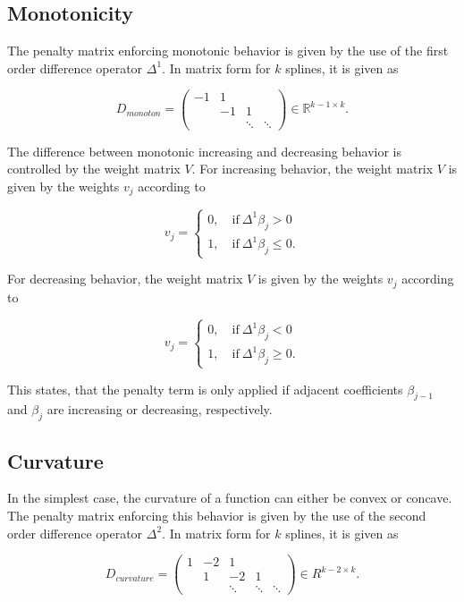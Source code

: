 \documentclass[10pt,a4paper]{article}
\begin{document}
	
	\subsection{Monotonicity}
	
	The penalty matrix enforcing monotonic behavior is given by the use of the first order difference operator $\Delta^1$. In matrix form for $k$ splines, it is given as
	
	$$D_{monoton} = \begin{pmatrix} -1 & 1  \\ 
									& -1 & 1 \\ 
									& & \ddots & \ddots  
				    \end{pmatrix} \in \mathbb{R}^{k-1 \times k}.$$
	
	The difference between monotonic increasing and decreasing behavior is controlled by the weight matrix $V$. For increasing behavior, the weight matrix $V$ is given by the weights $v_j$ according to
	
	$$v_j = \begin{cases} 0, \quad \text{if} \ \Delta^1\beta_j > 0 \\ 
					      1, \quad \text{if} \ \Delta^1\beta_j \le 0.
			\end{cases}$$
	
	For decreasing behavior, the weight matrix $V$ is given by the weights $v_j$ according to
	
	$$v_j = \begin{cases} 0, \quad \text{if} \ \Delta^1\beta_j < 0 \\ 
						  1, \quad \text{if} \ \Delta^1\beta_j \ge 0.
			\end{cases}$$
	
	This states, that the penalty term is only applied if adjacent coefficients $\beta_{j-1}$ and $\beta_j$ are increasing or decreasing, respectively. 
	
	\subsection{Curvature}
	
	In the simplest case, the curvature of a function can either be convex or concave. The penalty matrix  enforcing this behavior is given by the use of the second order difference operator $\Delta^2$. In matrix form for $k$ splines, it is given as
	
	$$D_{curvature} = \begin{pmatrix} 1 & -2 & 1 \\ & 1 &-2 &1 \\ & & \ddots & \ddots & \ddots  \end{pmatrix} \in R^{k-2 \times k}.$$
	
\end{document}
